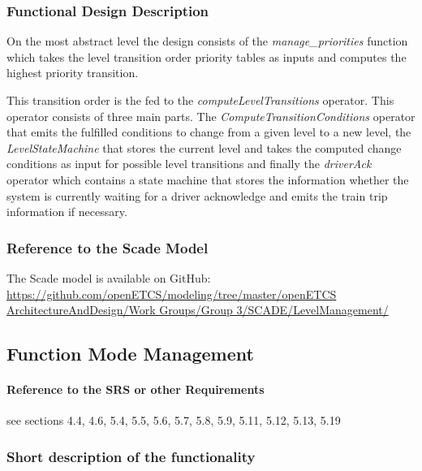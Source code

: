 \subsubsection{Functional Design Description}

On the most abstract level the design consists of the \emph{manage\_priorities} function which takes the level transition order priority tables as inputs and computes the highest priority transition.

This transition order is the fed to the \emph{computeLevelTransitions} operator. This operator consists of three main parts. The \emph{ComputeTransitionConditions} operator that emits the fulfilled conditions to change from a given level to a new level, the \emph{LevelStateMachine} that stores the current level and takes the computed change conditions as input for possible level transitions and finally the \emph{driverAck} operator which contains a state machine that stores the information whether the system is currently waiting for a driver acknowledge and emits the train trip information if necessary.


\subsubsection{Reference to the Scade Model}

The Scade model is available on GitHub:
\url{https://github.com/openETCS/modeling/tree/master/openETCS ArchitectureAndDesign/Work Groups/Group 3/SCADE/LevelManagement/}


\subsection{Function Mode Management}%
\paragraph{Reference to the SRS or other Requirements}
see \citep{subset-026} sections 4.4, 4.6, 5.4, 5.5, 5.6, 5.7, 5.8, 5.9, 5.11, 5.12, 5.13, 5.19

\subsubsection{Short description of the functionality}



